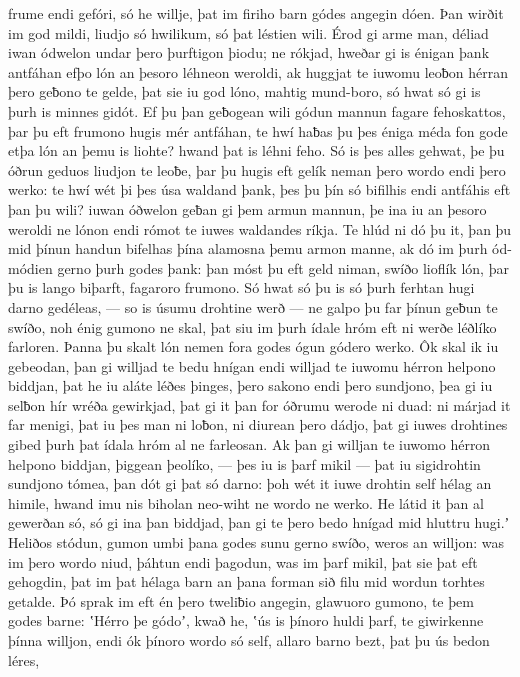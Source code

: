 frume endi gefóri, só he willje, þat im firiho barn
gódes angegin dóen. Þan wirðit im god mildi,
liudjo só hwilikum, só þat léstien wili.
Érod gi arme man, déliad iwan ódwelon
undar þero þurftigon þiodu; ne rókjad, hweðar gi is énigan þank antfáhan
efþo lón an þesoro léhneon weroldi, ak huggjat te iuwomu leoƀon hérran
þero geƀono te gelde, þat sie iu god lóno,
mahtig mund-boro, só hwat só gi is þurh is minnes gidót.
Ef þu þan geƀogean wili gódun mannun
fagare fehoskattos, þar þu eft frumono hugis
mér antfáhan, te hwí haƀas þu þes éniga méda fon gode
etþa lón an þemu is liohte? hwand þat is léhni feho.
Só is þes alles gehwat, þe þu óðrun geduos
liudjon te leoƀe, þar þu hugis eft gelík neman
þero wordo endi þero werko: te hwí wét þi þes úsa waldand þank,
þes þu þín só bifilhis endi antfáhis eft þan þu wili?
iuwan óðwelon geƀan gi þem armun mannun,
þe ina iu an þesoro weroldi ne lónon endi rómot te iuwes waldandes ríkja.
Te hlúd ni dó þu it, þan þu mid þínun handun bifelhas
þína alamosna þemu armon manne, ak dó im þurh ód-módien
gerno þurh godes þank: þan móst þu eft geld niman,
swíðo lioflík lón, þar þu is lango biþarft,
fagaroro frumono. Só hwat só þu is só þurh ferhtan hugi
darno gedéleas, — so is úsumu drohtine werð —
ne galpo þu far þínun geƀun te swíðo, noh énig gumono ne skal,
þat siu im þurh ídale hróm eft ni werðe
léðlíko farloren. Þanna þu skalt lón nemen
fora godes ógun gódero werko.
Ôk skal ik iu gebeodan, þan gi willjad te bedu hnígan
endi willjad te iuwomu hérron helpono biddjan,
þat he iu aláte léðes þinges,
þero sakono endi þero sundjono, þea gi iu selƀon hír
wréða gewirkjad, þat gi it þan for óðrumu werode ni duad:
ni márjad it far menigi, þat iu þes man ni loƀon,
ni diurean þero dádjo, þat gi iuwes drohtines gibed
þurh þat ídala hróm al ne farleosan.
Ak þan gi willjan te iuwomo hérron helpono biddjan,
þiggean þeolíko, — þes iu is þarf mikil —
þat iu sigidrohtin sundjono tómea,
þan dót gi þat só darno: þoh wét it iuwe drohtin self
hélag an himile, hwand imu nis biholan neo-wiht
ne wordo ne werko. He látid it þan al gewerðan só,
só gi ina þan biddjad, þan gi te þero bedo hnígad
mid hluttru hugi.ʼ Heliðos stódun,
gumon umbi þana godes sunu gerno swíðo,
weros an willjon: was im þero wordo niud,
þáhtun endi þagodun, was im þarf mikil,
þat sie þat eft gehogdin, þat im þat hélaga barn
an þana forman sið filu mid wordun
torhtes getalde. Þó sprak im eft én þero tweliƀio angegin,
glawuoro gumono, te þem godes barne:
ʽHérro þe gódoʼ, kwað he, ʽús is þínoro huldi þarf,
te giwirkenne þínna willjon, endi ók þínoro wordo só self,
allaro barno bezt, þat þu ús bedon léres,

